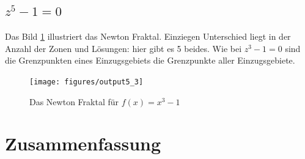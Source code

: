 \documentclass[a4paper,12pt]{llncs}
\numberwithin{equation}{section}
\begin{document}
\subsection{$z^5 -1 = 0$}
Das Bild \ref{fig:output5_3} illustriert das Newton Fraktal. 
Einziegen Unterschied liegt in der Anzahl der Zonen und Lösungen: hier gibt es 5 beides.
Wie bei $z^3 -1 = 0$ sind die Grenzpunkten eines Einzugsgebiets die Grenzpunkte aller Einzugsgebiete.
\begin{figure}[ht]   
	\centering
	\texttt{[image: figures/output5\_3]}
	\caption{Das Newton Fraktal für $f(x)=x^3-1$ }
	\label{fig:output5_3}
\end{figure}
\section{Zusammenfassung}

\fi
\newpage

 

\end{document}
